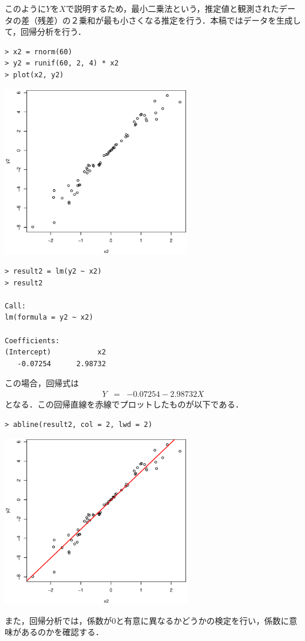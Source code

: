 このように$Y$を$X$で説明するため，最小二乗法という，推定値と観測されたデータの差（残差）の２乗和が最も小さくなる推定を行う．本稿ではデータを生成して，回帰分析を行う．
\begin{breakbox}
\begin{verbatim}
> x2 = rnorm(60)
> y2 = runif(60, 2, 4) * x2
> plot(x2, y2)
\end{verbatim}
\begin{center}
\includegraphics[width=8.2cm]{img/plot2.eps}
\end{center}
\begin{verbatim}
> result2 = lm(y2 ~ x2)
> result2

Call:
lm(formula = y2 ~ x2)

Coefficients:
(Intercept)           x2  
   -0.07254      2.98732  
\end{verbatim}
\end{breakbox}
この場合，回帰式は
\begin{eqnarray*}
Y&=&-0.07254-2.98732X
\end{eqnarray*}
となる．この回帰直線を赤線でプロットしたものが以下である．
\begin{breakbox}
\begin{verbatim}
> abline(result2, col = 2, lwd = 2)
\end{verbatim}
\begin{center}
\includegraphics[width=8.2cm]{img/abline2.eps}
\end{center}
\end{breakbox}
また，回帰分析では，係数が$0$と有意に異なるかどうかの検定を行い，係数に意味があるのかを確認する．

